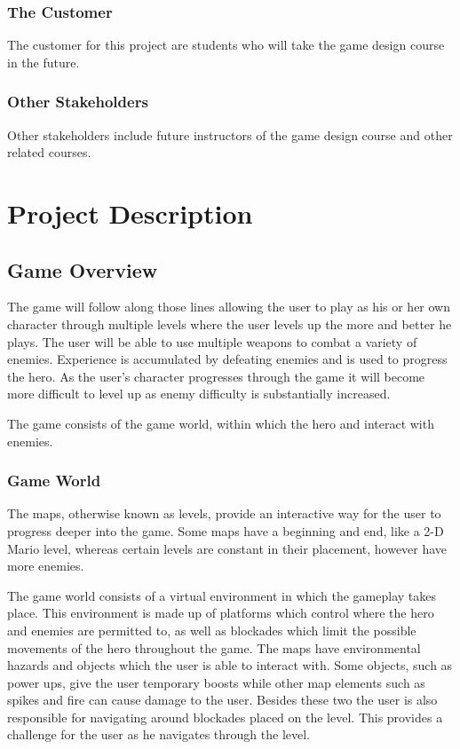 \documentclass[12pt, titlepage]{article}
\begin{document}
\subsubsection{The Customer}
The customer for this project are students who will take the game design course in the future.
\subsubsection{Other Stakeholders}
Other stakeholders include future instructors of the game design course and other related courses.
\section{Project Description}
\subsection{Game Overview}
The game will follow along those lines allowing the user to play as his or her own character through multiple levels where the user levels up the more and better he plays. The user will be able to use multiple weapons to combat a variety of enemies.  Experience is accumulated by defeating enemies and is used to progress the hero. As the user’s character progresses through the game it will become more difficult to level up as enemy difficulty is substantially increased.

The game consists of the game world, within which the hero and interact with enemies.

\subsubsection{Game World}
The maps, otherwise known as levels, provide an interactive way for the user to progress deeper into the game. Some maps have a beginning and end, like a 2-D Mario level, whereas certain levels are constant in their placement, however have more enemies.
 
The game world consists of a virtual environment in which the gameplay takes place.  This environment is made up of platforms which control where the hero and enemies are permitted to, as well as blockades which limit the possible movements of the hero throughout the game.   The maps have environmental hazards and objects which the user is able to interact with. Some objects, such as power ups, give the user temporary boosts while other map elements such as spikes and fire can cause damage to the user. Besides these two the user is also responsible for navigating around blockades placed on the level. This provides a challenge for the user as he navigates through the level.
\end{document}
